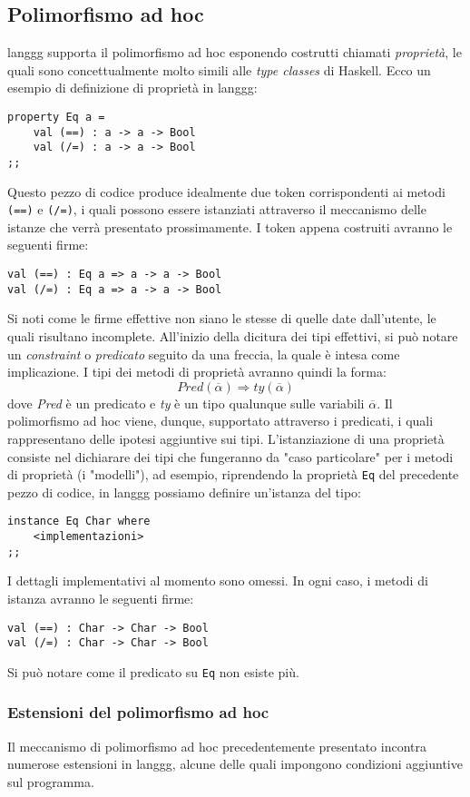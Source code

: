 \documentclass[10pt,a4paper]{article}
\begin{document}
\subsection{Polimorfismo ad hoc}
langgg supporta il polimorfismo ad hoc esponendo costrutti chiamati \textit{proprietà}, le quali sono concettualmente
molto simili alle \textit{type classes} di Haskell. Ecco un esempio di definizione di proprietà in langgg:
\begin{lstlisting}
property Eq a =
    val (==) : a -> a -> Bool
    val (/=) : a -> a -> Bool
;;
\end{lstlisting}
Questo pezzo di codice produce idealmente due token corrispondenti ai metodi \texttt{(==)} e \texttt{(/=)},
i quali possono essere istanziati attraverso il meccanismo delle istanze che verrà presentato prossimamente. I token
appena costruiti avranno le seguenti firme:
\begin{lstlisting}
val (==) : Eq a => a -> a -> Bool
val (/=) : Eq a => a -> a -> Bool
\end{lstlisting}
Si noti come le firme effettive non siano le stesse di quelle date dall'utente, le quali risultano incomplete.
All'inizio della dicitura dei tipi effettivi, si può notare un \textit{constraint} o \textit{predicato} seguito da una
freccia, la quale è intesa come implicazione. I tipi dei metodi di proprietà avranno quindi la forma:
    \[ Pred(\overline{\alpha}) \Rightarrow ty(\overline{\alpha}) \]
dove \textit{Pred} è un predicato e \textit{ty} è un tipo qualunque sulle variabili $ \overline{\alpha} $.
Il polimorfismo ad hoc viene, dunque, supportato attraverso i predicati, i quali rappresentano delle ipotesi aggiuntive
sui tipi. L'istanziazione di una proprietà consiste nel dichiarare dei tipi che fungeranno da "caso particolare" per i
metodi di proprietà (i "modelli"), ad esempio, riprendendo la proprietà \texttt{Eq} del precedente pezzo di codice,
in langgg possiamo definire un'istanza del tipo:
\begin{lstlisting}
instance Eq Char where
    <implementazioni>
;;
\end{lstlisting}
I dettagli implementativi al momento sono omessi. In ogni caso, i metodi di istanza avranno le seguenti firme:
\begin{lstlisting}
val (==) : Char -> Char -> Bool
val (/=) : Char -> Char -> Bool
\end{lstlisting}
Si può notare come il predicato su \texttt{Eq} non esiste più.

\subsubsection{Estensioni del polimorfismo ad hoc}
Il meccanismo di polimorfismo ad hoc precedentemente presentato incontra numerose estensioni in langgg, alcune delle
quali impongono condizioni aggiuntive sul programma.
\end{document}
